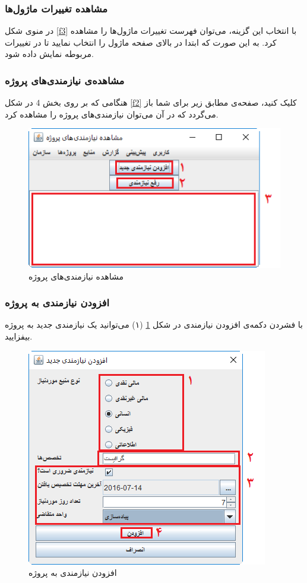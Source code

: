 \subsubsection{مشاهده تغییرات ماژول‌ها}
در منوی شکل
\ref{f3}
با انتخاب این گزینه، می‌توان فهرست تغییرات ماژول‌ها را مشاهده کرد. به این صورت که ابتدا در بالای صفحه ماژول را انتخاب نمایید تا در تغییرات مربوطه نمایش داده شود.

\subsubsection{مشاهده‌ی نیازمندی‌های پروژه}

هنگامی که بر روی بخش 4 در شکل
\ref{f2}
کلیک کنید، صفحه‌ی مطابق زیر برای شما باز می‌گردد که در آن می‌توان نیازمندی‌های پروژه را مشاهده کرد.

\begin{figure}[H]
	\centering
	\includegraphics[scale=0.7]{img/manual/viewPrjReqs}
	\caption{مشاهده نیازمندی‌های پروژه}
	\label{f102}
\end{figure}

\subsubsection{افزودن نیازمندی به پروژه}
با فشردن دکمه‌ی افزودن نیازمندی  در شکل 
\ref{f102}
(۱) می‌توانید یک نیازمندی جدید به پروژه بیفزایید.

\begin{figure}[H]
	\centering
	\includegraphics[scale=0.7]{img/manual/addReqToPrj}
	\caption{افزودن نیازمندی به پروژه}
	\label{f5}
\end{figure}

